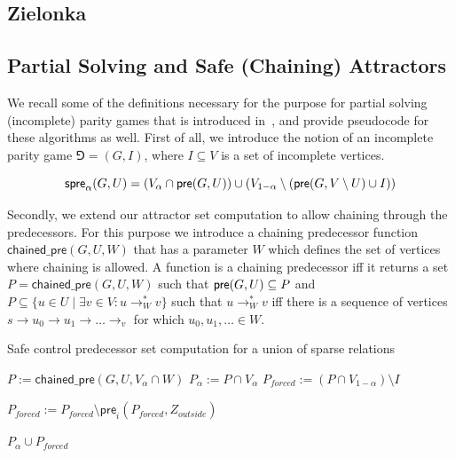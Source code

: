 \documentclass{article}
\newcommand{\var}[1]{\ensuremath{\textit{#1}}}
\begin{document}
\subsection{Zielonka}

\newpage
\subsection{Partial Solving and Safe (Chaining) Attractors}

We recall some of the definitions necessary for the purpose for partial solving (incomplete) parity games that is introduced in~\cite{DBLP:conf/tacas/LaveauxWW22}, and provide pseudocode for these algorithms as well.
First of all, we introduce the notion of an incomplete parity game $\Game = (G, I)$, where $I \subseteq V$ is a set of incomplete vertices.

\begin{equation*}
  \textsf{spre}_{\alpha}(G,U) = (V_{\alpha} \cap \textsf{pre}(G,U)) \cup (V_{1-\alpha} \setminus (\textsf{pre}(G,V \setminus U) \cup I))
\end{equation*}

Secondly, we extend our attractor set computation to allow chaining through the predecessors.
For this purpose we introduce a chaining predecessor function $\textsf{chained\_pre}(G, U, W)$ that has a parameter $W$ which defines the set of vertices where chaining is allowed.
A function is a chaining predecessor iff it returns a set $P = \textsf{chained\_pre}(G, U, W)$ such that $\textsf{pre}(G,U) \subseteq P$ and $P \subseteq \{ u \in U \mid \exists v \in V: u \rightarrow_W^* v \}$ such that $u \rightarrow_W^* v$ iff there is a sequence of vertices $s \rightarrow u_0 \rightarrow u_1 \rightarrow \ldots \rightarrow _v $ for which $u_0, u_1, \ldots \in W$.
 
 \begin{algorithm}[H]
 \caption{Safe control predecessor set computation for a union of sparse relations}
 \label{alg:safe_control_predecessor}
 \begin{algorithmic}[1]
 \Function{SPre$_\alpha$}{$\var{G} = (V, E, r, (V_0, V_1)$, $\var{U}$, $\var{Z}_\var{outside}, \var{I}, \var{W}$}
   \State $\var{P} := \textsf{chained\_pre}(\var{G}, \var{U}, V_\alpha \cap \var{W})$
   \State $\var{P}_\alpha := P \cap V_\alpha$
   \State $\var{P}_\var{forced} := (P \cap V_{1 - \alpha}) \setminus I$
   
     \State $\var{P}_\var{forced} := \var{P}_\var{forced} \setminus \textsf{pre}_i(\var{P}_\textit{forced}, \var{Z}_\var{outside})$  
   \EndFor
   
   \State \Return $\var{P}_\alpha \cup \var{P}_\var{forced}$
 \EndFunction
 \end{algorithmic}
 \end{algorithm}
\end{document}
